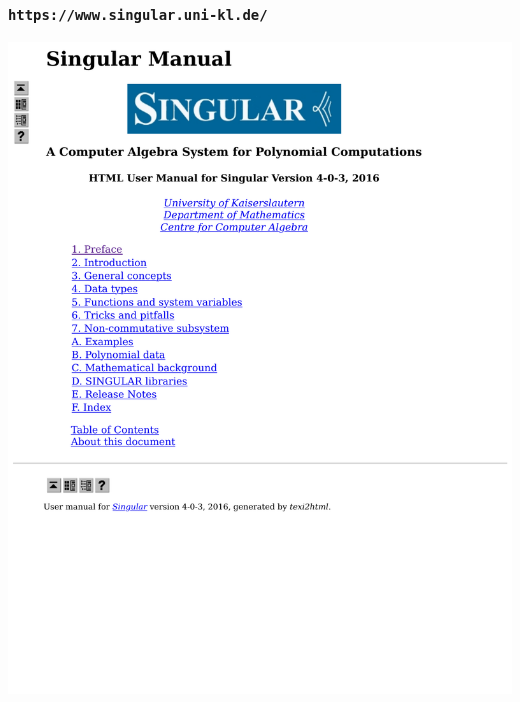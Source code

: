 \documentclass{beamer}
\begin{document}
\begin{frame}
\frametitle{\tt https://www.singular.uni-kl.de/}
\includegraphics[page=1, clip, trim=0in 1in 0in 0in, width=\textwidth]{Singular Manual Singular Manual.pdf}
\end{frame}
\end{document}
